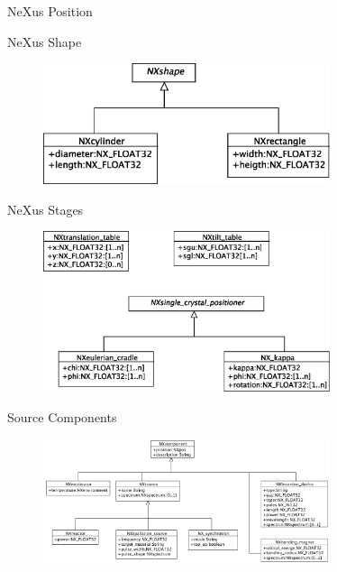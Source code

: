 \documentclass[final,nototal,pdf,mark]{prosper}
\begin{document}
\begin{slide}{NeXus Position }
\begin{center}
\end{center}

\end{slide}\begin{slide}{NeXus Shape }
\begin{center}
\begin{figure}
\includegraphics[width=0.75\textwidth]{nxshape.eps}\end{figure}



\end{center}
\end{slide}\begin{slide}{NeXus Stages }
\begin{center}
\begin{figure}
\includegraphics[width=0.75\textwidth]{nxstage.eps}\end{figure}



\end{center}
\end{slide}\begin{slide}{Source Components }
\begin{center}
\begin{figure}
\includegraphics[width=0.75\textwidth,height=0.75\textheight]{nxsource.eps}\end{figure}




\end{center}
\end{slide}
\end{document}
